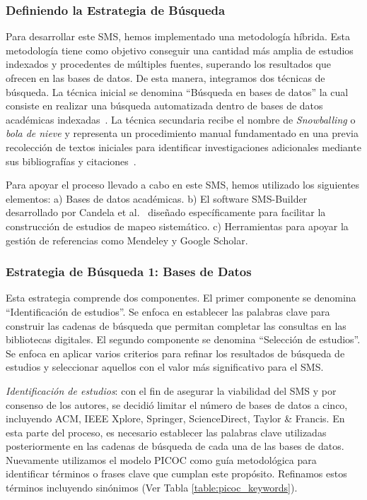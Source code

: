 \subsubsection{Definiendo la Estrategia de Búsqueda}\label{subsubsec:estrategia-busqueda}

Para desarrollar este SMS, hemos implementado una metodología híbrida. Esta metodología tiene como objetivo conseguir una cantidad más
amplia de estudios indexados y procedentes de múltiples fuentes, superando los resultados que ofrecen en las bases de datos. De esta manera, integramos dos técnicas de búsqueda. La técnica inicial se denomina ``Búsqueda en bases de datos'' la cual consiste en realizar una búsqueda automatizada dentro de bases de datos académicas indexadas~\cite{Jalai-01}. La técnica secundaria recibe el
nombre de \textit{Snowballing} o  \textit{bola de nieve} y representa un procedimiento manual fundamentado en una  previa recolección de textos iniciales para
identificar investigaciones adicionales mediante sus bibliografías y citaciones~\cite{Jalai-01,Goodman-01}.

Para apoyar el proceso llevado a cabo en este SMS, hemos utilizado los siguientes elementos: a) Bases de datos académicas. b) El software SMS-Builder desarrollado por Candela et al.~\cite{sms-builder-repo} diseñado específicamente para facilitar la construcción de estudios de mapeo sistemático. c) Herramientas para apoyar la gestión de referencias como Mendeley y Google Scholar. %



\subsubsection{Estrategia de Búsqueda 1: Bases de Datos}

Esta estrategia comprende dos componentes. El primer componente se denomina ``Identificación de estudios''. Se enfoca en establecer las palabras clave para construir las cadenas de búsqueda que permitan completar las consultas en las bibliotecas digitales. El segundo componente se denomina ``Selección de estudios''. Se enfoca en aplicar varios criterios para refinar los resultados de búsqueda de estudios y seleccionar aquellos con el valor más significativo para el SMS.\@

\textit{Identificación de estudios}: con el fin de asegurar la viabilidad del SMS y por consenso de los autores, se decidió limitar el número de bases de datos a cinco, incluyendo ACM, IEEE Xplore, Springer, ScienceDirect, Taylor \& Francis. En esta parte del proceso, es necesario establecer las palabras clave utilizadas posteriormente en las cadenas de búsqueda de cada una de las bases de datos. Nuevamente utilizamos el modelo PICOC como guía metodológica para identificar términos o frases clave que cumplan este propósito. Refinamos estos términos incluyendo sinónimos (Ver Tabla \ref{table:picoc_keywords}).

